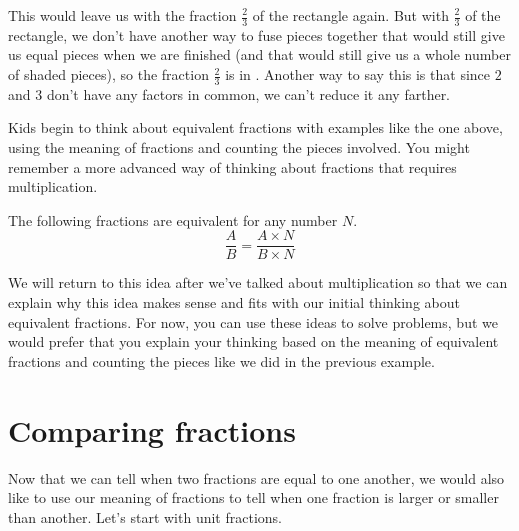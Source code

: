 \documentclass{ximera}
\begin{document}
This would leave us with the fraction $\frac{2}{3}$ of the rectangle again. But with $\frac{2}{3}$ of the rectangle, we don't have another way to fuse pieces together that would still give us equal pieces when we are finished (and that would still give us a whole number of shaded pieces), so the fraction $\frac{2}{3}$ is in . Another way to say this is that since $2$ and $3$ don't have any factors in common, we can't reduce it any farther.

Kids begin to think about equivalent fractions with examples like the one above, using the meaning of fractions and counting the pieces involved. You might remember a more advanced way of thinking about fractions that requires multiplication.

\begin{theorem}
	The following fractions are equivalent for any number $N$.
	\[
	\frac{A}{B} = \frac{A \times N}{B \times N}
	\]
\end{theorem}

We will return to this idea after we've talked about multiplication so that we can explain why this idea makes sense and fits with our initial thinking about equivalent fractions. For now, you can use these ideas to solve problems, but we would prefer that you explain your thinking based on the meaning of equivalent fractions and counting the pieces like we did in the previous example.


\section{Comparing fractions}

Now that we can tell when two fractions are equal to one another, we would also like to use our meaning of fractions to tell when one fraction is larger or smaller than another. Let's start with unit fractions.
\end{document}
